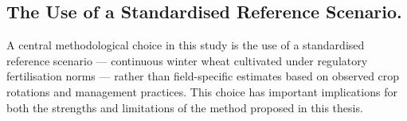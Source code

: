 \documentclass[12pt]{article}
\begin{document}







\subsection{The Use of a Standardised Reference Scenario.}

A central methodological choice in this study is the use of a standardised reference scenario --- continuous winter wheat cultivated under regulatory fertilisation norms --- rather than field-specific estimates based on observed crop rotations and management practices. 
This choice has important implications for both the strengths and limitations of the method proposed in this thesis.
\end{document}
